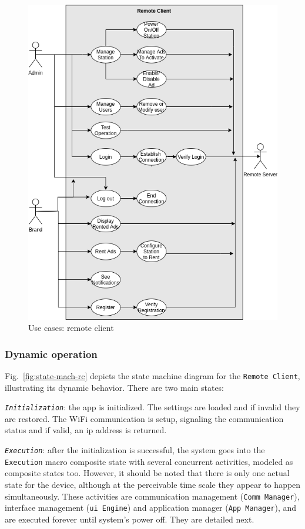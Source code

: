 \begin{figure}[htb!]
\centering
    \includegraphics[width=0.6\columnwidth]{./img/use-cases-rc.png}
  \caption{Use cases: remote client}%
\label{fig:use-cases-rc}
\end{figure}


\subsubsection{Dynamic operation}
\label{sec:dyn-oper-1}

Fig.~\ref{fig:state-mach-rc} depicts the state machine diagram for the
\texttt{Remote Client}, illustrating its dynamic behavior. There are two main
states:
\begin{item-c}
\item \emph{\texttt{Initialization}}: the app is initialized. The settings are loaded and if invalid they are restored. The WiFi communication is setup, signaling the communication status and if valid, an \gls{ip} address is returned.
\item \emph{\texttt{Execution}}: after the initialization is successful, the system goes into the \texttt{Execution} macro composite state with several concurrent activities, modeled as composite states too. However, it should be noted that there is only one actual state for the device, although at the perceivable time scale they appear to happen simultaneously. These activities are communication management (\texttt{Comm Manager}), interface management (\texttt{\gls{ui} Engine}) and application manager (\texttt{App Manager}), and are executed forever until system's power off. They are detailed next.
\end{item-c}

